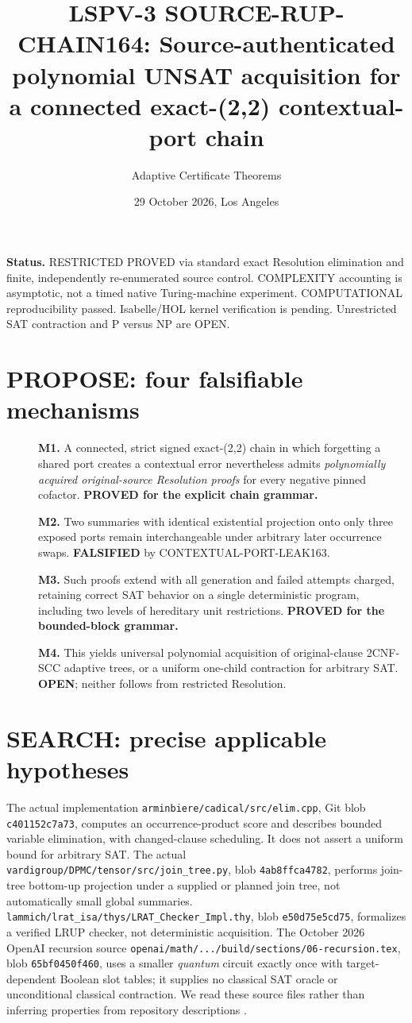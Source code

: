 \documentclass[11pt]{article}
\title{LSPV-3 SOURCE-RUP-CHAIN164: Source-authenticated polynomial UNSAT acquisition for a connected exact-(2,2) contextual-port chain}
\author{Adaptive Certificate Theorems}
\date{29 October 2026, Los Angeles}
\begin{document}
\maketitle
\noindent\textbf{Status.} RESTRICTED PROVED via standard exact Resolution elimination and finite, independently re-enumerated source control. COMPLEXITY accounting is asymptotic, not a timed native Turing-machine experiment. COMPUTATIONAL reproducibility passed. Isabelle/HOL kernel verification is pending. Unrestricted SAT contraction and P versus NP are OPEN.

\section{PROPOSE: four falsifiable mechanisms}
\begin{description}
\item[] \textbf{M1.} A connected, strict signed exact-(2,2) chain in which forgetting a shared port creates a contextual error nevertheless admits \emph{polynomially acquired original-source Resolution proofs} for every negative pinned cofactor. \textbf{PROVED for the explicit chain grammar.}
\item[] \textbf{M2.} Two summaries with identical existential projection onto only three exposed ports remain interchangeable under arbitrary later occurrence swaps. \textbf{FALSIFIED} by CONTEXTUAL-PORT-LEAK163.
\item[] \textbf{M3.} Such proofs extend with all generation and failed attempts charged, retaining correct SAT behavior on a single deterministic program, including two levels of hereditary unit restrictions. \textbf{PROVED for the bounded-block grammar.}
\item[] \textbf{M4.} This yields universal polynomial acquisition of original-clause 2CNF-SCC adaptive trees, or a uniform one-child contraction for arbitrary SAT. \textbf{OPEN}; neither follows from restricted Resolution.
\end{description}

\section{SEARCH: precise applicable hypotheses}
The actual implementation \texttt{arminbiere/cadical/src/elim.cpp}, Git blob \texttt{c401152c7a73}, computes an occurrence-product score and describes bounded variable elimination, with changed-clause scheduling. It does not assert a uniform bound for arbitrary SAT. The actual \texttt{vardigroup/DPMC/tensor/src/join\_tree.py}, blob \texttt{4ab8ffca4782}, performs join-tree bottom-up projection under a supplied or planned join tree, not automatically small global summaries. \texttt{lammich/lrat\_isa/thys/LRAT\_Checker\_Impl.thy}, blob \texttt{e50d75e5cd75}, formalizes a verified LRUP checker, not deterministic acquisition. The October 2026 OpenAI recursion source \texttt{openai/math/.../build/sections/06-recursion.tex}, blob \texttt{65bf0450f460}, uses a smaller \emph{quantum} circuit exactly once with target-dependent Boolean slot tables; it supplies no classical SAT oracle or unconditional classical contraction. We read these source files rather than inferring properties from repository descriptions \cite{davisputnam,cookreckhow}.
\end{document}
